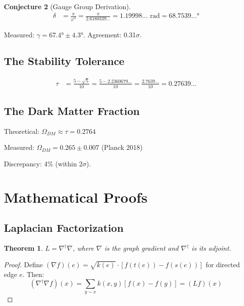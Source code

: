 \documentclass[11pt,a4paper]{article}
\theoremstyle{plain}
\newtheorem{theorem}{Theorem}[section]
\theoremstyle{definition}
\newtheorem{conjecture}[theorem]{Conjecture}
\theoremstyle{remark}
\begin{document}
\begin{conjecture}[Gauge Group Derivation]
\begin{align*}
\delta &= \frac{\pi}{\varphi^2} = \frac{\pi}{2.6180339...} = 1.19998... \text{ rad} = 68.7539...°
\end{align*}

Measured: $\gamma = 67.4° \pm 4.3°$. Agreement: 0.31$\sigma$.

\subsection{The Stability Tolerance}

\begin{align*}
\tau &= \frac{5-\sqrt{5}}{10} = \frac{5 - 2.2360679...}{10} = \frac{2.7639...}{10} = 0.27639...
\end{align*}

\subsection{The Dark Matter Fraction}

Theoretical: $\Omega_{DM} \approx \tau = 0.2764$

Measured: $\Omega_{DM} = 0.265 \pm 0.007$ (Planck 2018)

Discrepancy: 4\% (within 2$\sigma$).

\section{Mathematical Proofs}

\subsection{Laplacian Factorization}

\begin{theorem}
$L = \nabla^\dagger\nabla$, where $\nabla$ is the graph gradient and $\nabla^\dagger$ is its adjoint.
\end{theorem}

\begin{proof}
Define $(\nabla f)(e) = \sqrt{k(e)} \cdot [f(t(e)) - f(s(e))]$ for directed edge $e$. Then:
\begin{equation}
(\nabla^\dagger\nabla f)(x) = \sum_{y \sim x} k(x,y)[f(x) - f(y)] = (Lf)(x)
\end{equation}
\end{proof}


\end{conjecture}
\end{document}
